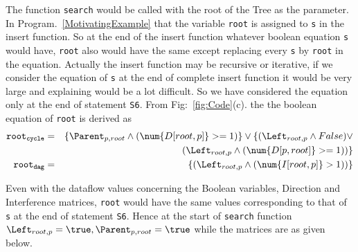 \begin{example}
 The function {\tt search} would be called with the root of the Tree as the parameter.
In Program.~\ref{MotivatingExample} that the variable {\tt root} is assigned to {\tt s} in the insert function. So at the end of the
insert function whatever boolean equation {\tt s} would have, {\tt root} also would have the same except replacing every {\tt s} by {\tt root} in the equation.
Actually the insert function may be recursive or iterative, if we consider the equation of {\tt s} at the end of complete insert function
it would be very large and explaining would be a lot difficult. So we have considered the equation only at the end of statement {\tt S6}. 
From Fig:~\ref{fig:Code}(c). the the boolean equation of {\tt root} is derived as 
\begin{eqnarray*}
{\tt root_{cycle}} &=& \{ \Parent_{p,root} \wedge ( \num{D[root,p]} >= 1) \} \vee \{  (\Left_{root,p}  \wedge False) \vee \\
 && (\Left_{root,p} \wedge   ( \num{D[p,root]} >= 1)) \} \\
{\tt root_{dag}} &=&  \{ (\Left_{root,p} \wedge   ( \num{I[root,p]} > 1)) \} 
\end{eqnarray*}

Even with the dataflow values concerning the Boolean variables, Direction and Interference matrices, {\tt root} would have the same values corresponding to that
of {\tt s} at the end of statement {\tt S6}. Hence at the start of  {\tt search} function $\Left_{root,p} = \true , \Parent_{p,root} = \true$  while the matrices are as given below.  \\



\end{example}
